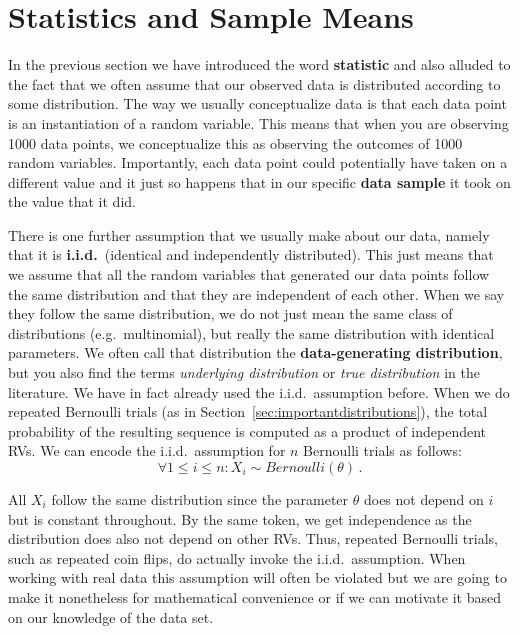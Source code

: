 \section{Statistics and Sample Means}

In the previous section we have introduced the word \textbf{statistic} and also alluded to the fact that we often assume that our
observed data is distributed according to some distribution. The way we usually conceptualize data is that each data point is
an instantiation of a random variable. This means that when you are observing 1000 data points, we conceptualize this as observing
the outcomes of 1000 random variables. Importantly, each data point could potentially have taken on a different value and it just 
so happens that in our specific \textbf{data sample} it took on the value that it did. 

There is one further assumption that we usually make about our data, namely that it is \textbf{i.i.d.}\ (identical and independently
distributed). This just means that we assume that all the random variables that generated our data points follow the same distribution and 
that they are independent of each other. When we say they follow the same distribution, we do not just mean the same class of
distributions (e.g.\ multinomial), but really the same distribution with identical parameters. We often
call that distribution the \textbf{data-generating distribution}, but you also find the terms 
\textit{underlying distribution} or \textit{true distribution} in the literature. 
We have in fact already used the i.i.d.\ assumption before. When we do repeated Bernoulli trials (as in Section~\ref{sec:importantdistributions}), the total probability of the resulting sequence is computed as a product
of independent RVs. We can encode the i.i.d.\ assumption for $ n $ Bernoulli trials as follows:
\begin{equation}
\forall  1 \leq i \leq n : X_{i} \sim Bernoulli(\theta) \, .
\end{equation}

All $ X_{i} $ follow the same distribution since the parameter $ \theta $ does not depend on $ i $ but is constant throughout.
By the same token, we get independence as the distribution does also not depend on other RVs. Thus, repeated Bernoulli trials,
such as repeated coin flips, do actually invoke the i.i.d.\ assumption. When working with real data this assumption will often be
violated but we are going to make it nonetheless for mathematical convenience or if we can motivate it
based on our knowledge of the data set.

